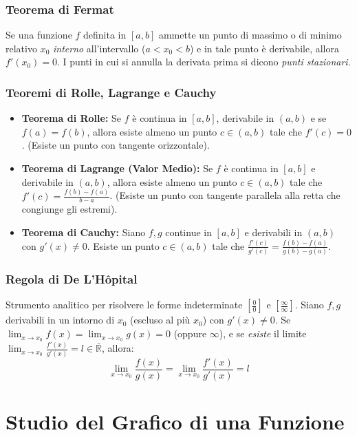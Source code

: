 \subsubsection{Teorema di Fermat}
Se una funzione $f$ definita in $[a,b]$ ammette un punto di massimo o di minimo relativo $x_0$ \textit{interno} all'intervallo ($a < x_0 < b$) e in tale punto è derivabile, allora $f'(x_0) = 0$. I punti in cui si annulla la derivata prima si dicono \textit{punti stazionari}.

\subsubsection{Teoremi di Rolle, Lagrange e Cauchy}
\begin{itemize}
    \item \textbf{Teorema di Rolle:} Se $f$ è continua in $[a,b]$, derivabile in $(a,b)$ e se $f(a)=f(b)$, allora esiste almeno un punto $c \in (a,b)$ tale che $f'(c) = 0$. (Esiste un punto con tangente orizzontale).
    \item \textbf{Teorema di Lagrange (Valor Medio):} Se $f$ è continua in $[a,b]$ e derivabile in $(a,b)$, allora esiste almeno un punto $c \in (a,b)$ tale che $f'(c) = \frac{f(b)-f(a)}{b-a}$. (Esiste un punto con tangente parallela alla retta che congiunge gli estremi).
    \item \textbf{Teorema di Cauchy:} Siano $f, g$ continue in $[a,b]$ e derivabili in $(a,b)$ con $g'(x) \neq 0$. Esiste un punto $c \in (a,b)$ tale che $\frac{f'(c)}{g'(c)} = \frac{f(b)-f(a)}{g(b)-g(a)}$.
\end{itemize}

\subsubsection{Regola di De L'Hôpital}
Strumento analitico per risolvere le forme indeterminate $\left[\frac{0}{0}\right]$ e $\left[\frac{\infty}{\infty}\right]$. 
Siano $f, g$ derivabili in un intorno di $x_0$ (escluso al più $x_0$) con $g'(x) \neq 0$. Se $\lim_{x \to x_0} f(x) = \lim_{x \to x_0} g(x) = 0$ (oppure $\infty$), e se \textit{esiste} il limite $\lim_{x \to x_0} \frac{f'(x)}{g'(x)} = l \in \bar{\mathbb{R}}$, allora:
\[ \lim_{x \to x_0} \frac{f(x)}{g(x)} = \lim_{x \to x_0} \frac{f'(x)}{g'(x)} = l \]

\section{Studio del Grafico di una Funzione}
